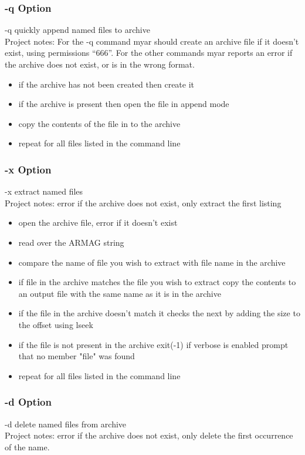 \documentclass[letterpaper,10pt,notitlepage,fleqn]{article}
\begin{document}
\subsubsection*{-q     Option}       
-q quickly append named files to archive\\
Project notes: For the -q command myar should create an archive file if it doesn't exist, using permissions ``666''. For the other commands myar reports an error if the archive does not exist, or is in the wrong format.
\begin{itemize}
\item if the archive has not been created then create it
\item if the archive is present then open the file in append mode
\item copy the contents of the file in to the archive
\item repeat for all files listed in the command line
\end{itemize}

\subsubsection*{-x     Option}
-x extract named files\\
Project notes: error if the archive does not exist, only extract the first listing
    
\begin{itemize}
\item open the archive file, error if it doesn't exist
\item read over the ARMAG string
\item compare the name of file you wish to extract with file name in the archive
\item if file in the archive matches the file you wish to extract copy the contents to an output file with the same name as it is in the archive
\item if the file in the archive doesn't match it checks the next by adding the size to the offset using lseek
\item if the file is not present in the archive exit(-1) if verbose is enabled prompt that no member "file" was found
\item repeat for all files listed in the command line
\end{itemize}

\subsubsection*{-d     Option}    
-d	delete named files from archive\\
Project notes: error if the archive does not exist, only delete the first occurrence of the name.
\end{document}
